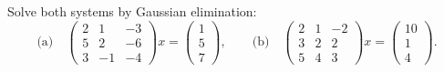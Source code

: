 \begin{problem}\label{ex:01:gaussian-unique-solutions}
Solve both systems by Gaussian elimination:
\[
\text{(a)}\quad
\begin{pmatrix}2&1&-3\\5&2&-6\\3&-1&-4\end{pmatrix}x
=\begin{pmatrix}1\\5\\7\end{pmatrix},
\qquad
\text{(b)}\quad
\begin{pmatrix}2&1&-2\\3&2&2\\5&4&3\end{pmatrix}x
=\begin{pmatrix}10\\1\\4\end{pmatrix}.
\]
\end{problem}
